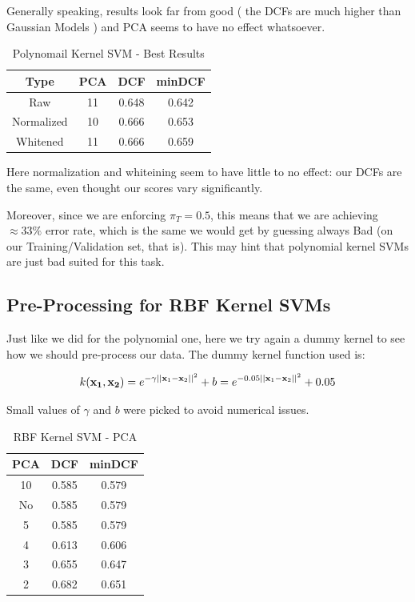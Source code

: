 \documentclass[twocolumn]{article}
\begin{document}
Generally speaking, results look far from good ( the DCFs are much higher than Gaussian Models ) and PCA seems to have no effect whatsoever.

\begin{table}[H]
    \centering
        \begin{tabular}{||c|c|c|c||}
            \hline
            Type & PCA & DCF & minDCF \\
            \hline
            \hline
            Raw & 11 & 0.648 &  0.642 \\
            Normalized & 10 & 0.666 &  0.653 \\
            Whitened & 11 & 0.666 &  0.659 \\
            \hline
    \end{tabular}
    \caption{Polynomail Kernel SVM - Best Results}
\end{table}

Here normalization and whiteining seem to have little to no effect: our DCFs are the same, even thought our scores vary significantly.

Moreover, since we are enforcing $\pi_T = 0.5$, this means that we are achieving $ \approx 33\% $ error rate, which is the same we would get by guessing always Bad (on our Training/Validation set, that is).
This may hint that polynomial kernel SVMs are just bad suited for this task.

\subsection{Pre-Processing for RBF Kernel SVMs}

Just like we did for the polynomial one, here we try again a dummy kernel to see how we should pre-process our data.
The dummy kernel function used is: 

$$\displaystyle k({\bf x_1}, {\bf x_2}) = e^{-\gamma||{\bf x}_1 - {\bf x}_2||^2} + b = e^{-0.05||{\bf x}_1 - {\bf x}_2||^2} + 0.05 $$

Small values of $\gamma$ and $b$ were picked to avoid numerical issues.


\begin{table}[H]
    \centering
        \begin{tabular}{||c|c|c||}
            \hline
            PCA & DCF & minDCF \\
            \hline
            \hline
            10 & 0.585 &  0.579 \\ 
            No & 0.585 &  0.579 \\ 
            5 & 0.585 &  0.579 \\ 
            \hline
            \hline
            4 & 0.613 &  0.606 \\ 
            3 & 0.655 &  0.647 \\ 
            2 & 0.682 &  0.651 \\ 
            \hline
    \end{tabular}
    \caption{RBF Kernel SVM - PCA}
\end{table}
\end{document}
